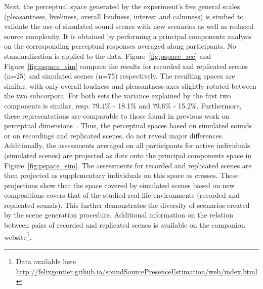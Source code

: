 \documentclass[twocolumn]{article}
\begin{document}
Next, the perceptual space generated by the experiment's five general scales (pleasantness, liveliness, overall loudness, interest and calmness) is studied to validate the use of simulated sound scenes with new scenarios as well as reduced source complexity. It is obtained by performing a principal components analysis on the corresponding perceptual responses averaged along participants. No standardization is applied to the data. Figure~\ref{fig:pspace_rec} and Figure~\ref{fig:pspace_sim} compare the results for recorded and replicated scenes (n=25) and simulated scenes (n=75) respectively. The resulting spaces are similar, with only overall loudness and pleasantness axes slightly rotated between the two subcorpora. For both sets the variance explained by the first two components is similar, resp. 79.4\% - 18.1\% and 79.6\% - 15.2\%. Furthermore, these representations are comparable to those found in previous work on perceptual dimensions~\cite{axelsson2010, cain2013}. Thus, the perceptual spaces based on simulated sounds or on recordings and replicated scenes, do not reveal major differences. Additionally, the assessments averaged on all participants for active individuals (simulated scenes) are projected as dots onto the principal components space in Figure~\ref{fig:pspace_sim}. The assessments for recorded and replicated scenes are then projected as supplementary individuals on this space as crosses. These projections show that the space covered by simulated scenes based on new compositions covers that of the studied real-life environments (recorded and replicated sounds). This further demonstrates the diversity of scenarios created by the scene generation procedure. Additional information on the relation between pairs of recorded and replicated scenes is available on the companion website\footnote{Data available here \url{http://felixgontier.github.io/soundSourcePresenceEstimation/web/index.html}}.

\end{document}
